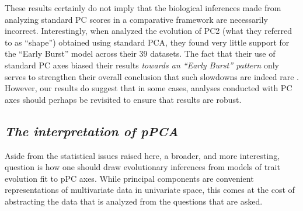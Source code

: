 \documentclass[a4paper,12pt]{article}
\begin{document}
These results certainly do not imply that the biological inferences made from analyzing standard PC scores in a comparative framework are necessarily incorrect. %
Interestingly, when \citet{Harmon2010} analyzed the evolution of PC2 (what they referred to as ``shape'') obtained using standard PCA, they found very little support for the ``Early Burst'' model \citep{Blomberg2003} across their 39 datasets. The fact that their use of standard PC axes biased their results \emph{towards an ``Early Burst'' pattern} only serves to strengthen their overall conclusion that such slowdowns are indeed rare \citep[but see][]{SlaterPennell}. However, our results do suggest that in some cases, analyses conducted with PC axes should perhaps be revisited to ensure that results are robust.





\subsection{\emph{The interpretation of pPCA}}

Aside from the statistical issues raised here, a broader, and more interesting, question is how one should draw evolutionary inferences from models of trait evolution fit to pPC axes. While principal components are convenient representations of multivariate data in univariate space, this comes at the cost of abstracting the data that is analyzed from the questions that are asked. 
\end{document}
